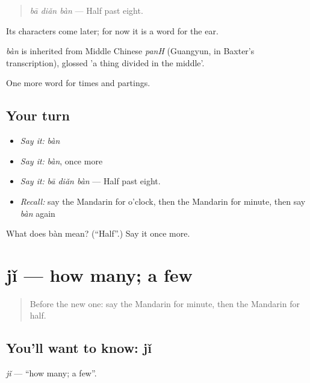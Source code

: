 \begin{quote}
\emph{bā diǎn bàn} — Half past eight.
\end{quote}

Its characters come later; for now it is a word for the ear.

\begin{cousinweb}
\emph{bàn} is inherited from Middle Chinese \emph{panH} (Guangyun, in Baxter's transcription), glossed 'a thing divided in the middle'.
\end{cousinweb}

\begin{grammarlens}[title={What you've built}]
One more word for times and partings.
\end{grammarlens}

\subsection*{Your turn}
\begin{itemize}
\raggedright
  \item \emph{Say it:} \emph{bàn}
  \item \emph{Say it:} \emph{bàn}, once more
  \item \emph{Say it:} \emph{bā diǎn bàn} — Half past eight.
  \item \emph{Recall:} say the Mandarin for o'clock, then the Mandarin for minute, then say \emph{bàn} again
\end{itemize}

\begin{tcolorbox}[breakable,colback=teal!4,colframe=teal!35!black,title={Before you move on}]
What does bàn mean? (\textquotedblleft{}Half\textquotedblright{}.) Say it once more.
\end{tcolorbox}
\section[jǐ]{jǐ — how many; a few}

\label{lesson:ZH-C48-ji}



\begin{quote}
Before the new one: say the Mandarin for minute, then the Mandarin for half.
\end{quote}

\subsection*{You'll want to know: jǐ}
\emph{jǐ} — \textquotedblleft{}how many; a few\textquotedblright{}.

